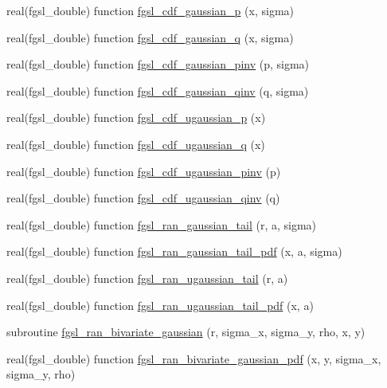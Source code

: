 \begin{DoxyCompactItemize}
\item 
real(fgsl\-\_\-double) function \hyperlink{rng_8finc_a613160a77385ab379bf3a6f5192a97a8}{fgsl\-\_\-cdf\-\_\-gaussian\-\_\-p} (x, sigma)
\item 
real(fgsl\-\_\-double) function \hyperlink{rng_8finc_a257b07452a48220b30b6b6b929637e79}{fgsl\-\_\-cdf\-\_\-gaussian\-\_\-q} (x, sigma)
\item 
real(fgsl\-\_\-double) function \hyperlink{rng_8finc_aa602d289238eeb5318d7b10562f84343}{fgsl\-\_\-cdf\-\_\-gaussian\-\_\-pinv} (p, sigma)
\item 
real(fgsl\-\_\-double) function \hyperlink{rng_8finc_a8f03982161ce0fc231bc4f7526265dc6}{fgsl\-\_\-cdf\-\_\-gaussian\-\_\-qinv} (q, sigma)
\item 
real(fgsl\-\_\-double) function \hyperlink{rng_8finc_a7f2710deecdd590d946d38f33f433e9f}{fgsl\-\_\-cdf\-\_\-ugaussian\-\_\-p} (x)
\item 
real(fgsl\-\_\-double) function \hyperlink{rng_8finc_ac8d79a3464dcf4018b294bb46be5c63c}{fgsl\-\_\-cdf\-\_\-ugaussian\-\_\-q} (x)
\item 
real(fgsl\-\_\-double) function \hyperlink{rng_8finc_a5200879f9cfb0062711be785cb73d8ba}{fgsl\-\_\-cdf\-\_\-ugaussian\-\_\-pinv} (p)
\item 
real(fgsl\-\_\-double) function \hyperlink{rng_8finc_a13c5f38d6806b5f065acab4c2f02cd72}{fgsl\-\_\-cdf\-\_\-ugaussian\-\_\-qinv} (q)
\item 
real(fgsl\-\_\-double) function \hyperlink{rng_8finc_a375409ed447b32016b5901dd7adb5146}{fgsl\-\_\-ran\-\_\-gaussian\-\_\-tail} (r, a, sigma)
\item 
real(fgsl\-\_\-double) function \hyperlink{rng_8finc_a11151be72007e872d4101d2d1fc8a3c2}{fgsl\-\_\-ran\-\_\-gaussian\-\_\-tail\-\_\-pdf} (x, a, sigma)
\item 
real(fgsl\-\_\-double) function \hyperlink{rng_8finc_a7b84620d10a8d1817b621f3a5aedf487}{fgsl\-\_\-ran\-\_\-ugaussian\-\_\-tail} (r, a)
\item 
real(fgsl\-\_\-double) function \hyperlink{rng_8finc_a54ba0fdd3a089ba1f385bf126c25564a}{fgsl\-\_\-ran\-\_\-ugaussian\-\_\-tail\-\_\-pdf} (x, a)
\item 
subroutine \hyperlink{rng_8finc_ac2fd8a36b4c4ed1ef257fc4ea9887902}{fgsl\-\_\-ran\-\_\-bivariate\-\_\-gaussian} (r, sigma\-\_\-x, sigma\-\_\-y, rho, x, y)
\item 
real(fgsl\-\_\-double) function \hyperlink{rng_8finc_ab5fb0d52054fac443429a9262a23b062}{fgsl\-\_\-ran\-\_\-bivariate\-\_\-gaussian\-\_\-pdf} (x, y, sigma\-\_\-x, sigma\-\_\-y, rho)

\end{DoxyCompactItemize}
